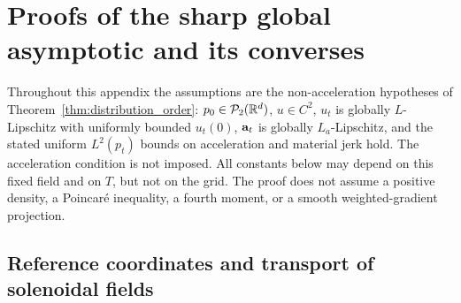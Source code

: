 \section{Proofs of the sharp global asymptotic and its converses}
\label{app:sharp-global}

Throughout this appendix the assumptions are the non-acceleration
hypotheses of Theorem~\ref{thm:distribution_order}: $p_0\in\mathcal P_2(\mathbb R^d)$,
$u\in C^2$, $u_t$ is globally $L$-Lipschitz with uniformly bounded
$u_t(0)$, $\mathbf a_t$ is globally $L_a$-Lipschitz, and the stated uniform
$L^2(p_t)$ bounds on acceleration and material jerk hold.  The
acceleration condition is not imposed.  All constants below may depend
on this fixed field and on $T$, but not on the grid.  The proof does not
assume a positive density, a Poincar\'e inequality, a fourth moment, or
a smooth weighted-gradient projection.

\subsection{Reference coordinates and transport of solenoidal fields}

